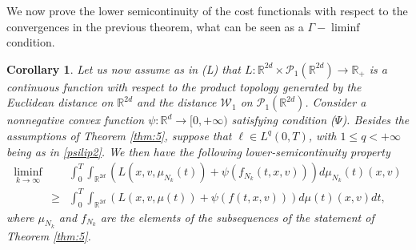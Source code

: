 \documentclass[11pt]{article}
\theoremstyle{plain}
\newtheorem{corollary}[theorem]{Corollary}
\theoremstyle{definition}
\theoremstyle{remark}
\numberwithin{equation}{section}
\newcommand{\R}{{\mathbb R}}
\begin{document}
We now prove the lower semicontinuity of the cost functionals with respect to the convergences in the previous theorem, what can be seen as a $\Gamma-\liminf$ condition.
\begin{corollary}\label{cor:3}
Let us now  assume as in (L) that $L: \mathbb R^{2d} \times \mathcal P_1 (\mathbb R^{2d})\to \mathbb R_+$
is a continuous function with respect to the product topology generated by the Euclidean distance on $\R^{2d}$ and the distance $\mathcal W_1$ on $\mathcal P_1 (\mathbb R^{2d})$. Consider a nonnegative convex function $\psi:\R^d \to [0,+\infty)$ satisfying condition ($\Psi$). Besides the assumptions of Theorem \ref{thm:5}, suppose that $\ell \in L^q(0,T)$, with $1\le q<+\infty$ being as in \eqref{psilip2}. We then have the following lower-semicontinuity property 
\begin{eqnarray}
 \liminf_{k \to \infty} && \int_0^T \int_{\mathbb R^{2d}} (L(x,v,\mu_{N_k}(t)) + \psi(f_{N_k}(t,x,v))) d\mu_{N_k}(t)(x,v)  \nonumber \\ 
&\geq & \int_0^T \int_{\mathbb R^{2d}} (L(x,v,\mu(t)) + \psi(f(t,x,v))) d\mu(t)(x,v)dt, \label{Gammaliminf}
\end{eqnarray}
where $\mu_{N_k}$ and $f_{N_k}$ are the elements of the subsequences of the statement of Theorem \ref{thm:5}.
\end{corollary}
\end{document}
